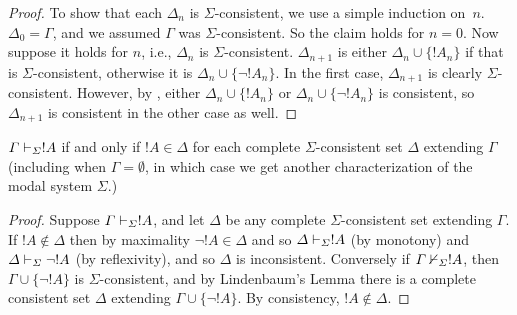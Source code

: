 \documentclass[../../../include/open-logic-section]{subfiles}
\begin{document}
\begin{proof}
To show that each $\Delta_n$ is $\Sigma$-consistent, we use a simple
induction on~$n$. $\Delta_0 = \Gamma$, and we assumed $\Gamma$ was
$\Sigma$-consistent. So the claim holds for $n = 0$. Now suppose it
holds for $n$, i.e., $\Delta_n$ is $\Sigma$-consistent. $\Delta_{n+1}$
is either $\Delta_n \cup \{!A_n\}$ if that is $\Sigma$-consistent,
otherwise it is $\Delta_n \cup \{\lnot!A_n\}$. In the first case,
$\Delta_{n+1}$ is clearly $\Sigma$-consistent. However, by
,
either $\Delta_n \cup \{!A_n\}$ or $\Delta_n \cup \{\lnot!A_n\}$ is
consistent, so $\Delta_{n+1}$ is consistent in the other case as well.
\end{proof}

\begin{cor}
  $\Gamma \Proves[\Sigma] !A$ if and only if $!A \in \Delta$ for
  each  complete $\Sigma$-consistent set $\Delta$ extending $\Gamma$
  (including when $\Gamma = \emptyset$, in which case we get another
  characterization of the modal system $\Sigma$.)
\end{cor}

\begin{proof}
  Suppose $\Gamma \Proves[\Sigma] !A$, and let $\Delta$ be any
  complete $\Sigma$-consistent set extending $\Gamma$. If $!A
  \notin \Delta$ then by maximality $\lnot!A \in \Delta$ and so
  $\Delta \Proves[\Sigma] !A$ (by monotony) and $\Delta
  \Proves[\Sigma] \lnot!A$ (by reflexivity), and so $\Delta$ is
  inconsistent. Conversely if $\Gamma \Proves/[\Sigma] !A$, then
  $\Gamma \cup \{ \lnot!A\}$ is $\Sigma$-consistent, and by
  Lindenbaum's Lemma there is a complete consistent set $\Delta$
  extending $\Gamma \cup \{ \lnot!A \}$. By consistency, $!A
  \notin \Delta$.
\end{proof}
\end{document}
